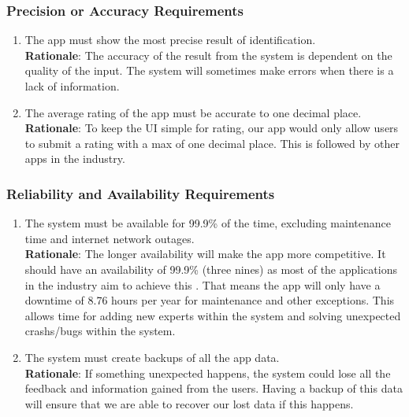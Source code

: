 \subsubsection{Precision or Accuracy Requirements}
\label{ssub:precision_or_accuracy_requirements}
\begin{enumerate}[{PR-PA}1. ]
	\item The app must show the most precise result of identification.
	\\ \textbf{Rationale}: The accuracy of the result from the system is dependent on the quality of the input. The system will sometimes make errors when there is a lack of information.
	\item The average rating of the app must be accurate to one decimal place.
	\\ \textbf{Rationale}: To keep the UI simple for rating, our app would only allow users to submit a rating with a max of one decimal place. This is followed by other apps in the industry. 
\end{enumerate}

\subsubsection{Reliability and Availability Requirements}
\label{ssub:reliability_and_availability_requirements}
\begin{enumerate}[{PR-RA}1. ]
	\item The system must be available for 99.9\% of the time, excluding maintenance time and internet network outages.
	\\ \textbf{Rationale}: The longer availability will make the app more competitive. It should have an availability of 99.9\% (three nines) as most of the applications in the industry aim to achieve this \cite{Britannica2025_WritingSystems}. That means the app will only have a downtime of 8.76 hours per year for maintenance and other exceptions. This allows time for adding new experts within the system and solving unexpected crashs/bugs within the system.
	\item The system must create backups of all the app data.
	\\ \textbf{Rationale}: If something unexpected happens, the system could lose all the feedback and information gained from the users. Having a backup of this data will ensure that we are able to recover our lost data if this happens.
\end{enumerate}


